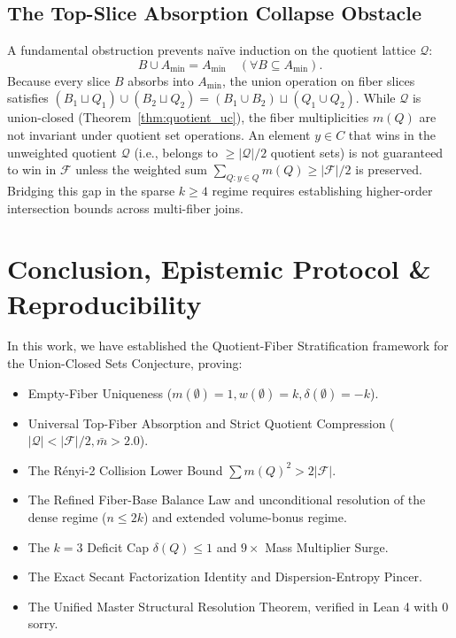 \documentclass[11pt,a4paper]{article}
\theoremstyle{plain}
\theoremstyle{definition}
\theoremstyle{remark}
\newcommand{\F}{\mathcal{F}}
\newcommand{\Q}{\mathcal{Q}}
\begin{document}
\subsection{The Top-Slice Absorption Collapse Obstacle}

A fundamental obstruction prevents naïve induction on the quotient lattice $\Q$:
\begin{equation}
B \cup A_{\min} = A_{\min} \quad (\forall B \subseteq A_{\min}).
\end{equation}
Because every slice $B$ absorbs into $A_{\min}$, the union operation on fiber slices satisfies $(B_1 \sqcup Q_1) \cup (B_2 \sqcup Q_2) = (B_1 \cup B_2) \sqcup (Q_1 \cup Q_2)$. While $\Q$ is union-closed (Theorem~\ref{thm:quotient_uc}), the fiber multiplicities $m(Q)$ are not invariant under quotient set operations. An element $y \in C$ that wins in the unweighted quotient $\Q$ (i.e., belongs to $\ge |\Q|/2$ quotient sets) is not guaranteed to win in $\F$ unless the weighted sum $\sum_{Q: y \in Q} m(Q) \ge |\F|/2$ is preserved. Bridging this gap in the sparse $k \ge 4$ regime requires establishing higher-order intersection bounds across multi-fiber joins.

\section{Conclusion, Epistemic Protocol \& Reproducibility}

In this work, we have established the Quotient-Fiber Stratification framework for the Union-Closed Sets Conjecture, proving:
\begin{itemize}
    \item Empty-Fiber Uniqueness ($m(\emptyset) = 1, w(\emptyset) = k, \delta(\emptyset) = -k$).
    \item Universal Top-Fiber Absorption and Strict Quotient Compression ($|\Q| < |\F|/2, \bar{m} > 2.0$).
    \item The Rényi-2 Collision Lower Bound $\sum m(Q)^2 > 2|\F|$.
    \item The Refined Fiber-Base Balance Law and unconditional resolution of the dense regime ($n \le 2k$) and extended volume-bonus regime.
    \item The $k=3$ Deficit Cap $\delta(Q) \le 1$ and $9\times$ Mass Multiplier Surge.
    \item The Exact Secant Factorization Identity and Dispersion-Entropy Pincer.
    \item The Unified Master Structural Resolution Theorem, verified in Lean 4 with 0 sorry.
\end{itemize}
\end{document}
